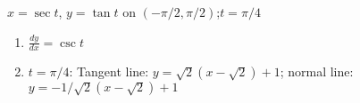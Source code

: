 {$x=\sec t$, $y=\tan t$ on $(-\pi/2,\pi/2)$;\quad $t=\pi/4$}
{\begin{enumerate}
	\item $\frac{dy}{dx} = \csc t$
	\item	$t=\pi/4$: Tangent line: $y=\sqrt{2}(x-\sqrt{2})+1$; normal line: $y = -1/\sqrt{2}(x-\sqrt{2})+1$
\end{enumerate}
}
